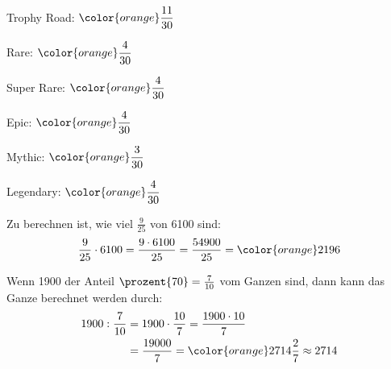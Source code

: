 \documentclass[12pt,a5paper,landscape]{scrartcl}
\def\clrLsg{\color{orange}}
\begin{document}
	\begin{loesungskarte}
		\begin{multicols}{2}
		\begin{enumeratea}
			\item \begin{smallitemize}
				\item Trophy Road: $\clrLsg\dfrac{11}{30}$
				\item Rare: $\clrLsg\dfrac{4}{30}$
				\item Super Rare: $\clrLsg\dfrac{4}{30}$
				\item Epic: $\clrLsg\dfrac{4}{30}$
				\item Mythic: $\clrLsg\dfrac{3}{30}$
				\item Legendary: $\clrLsg\dfrac{4}{30}$
			\end{smallitemize}
			
			\item Zu berechnen ist, wie viel $\tfrac{9}{25}$ von \num{6100} sind:
			\[ \frac{9}{25}\cdot 6100 = \frac{9\cdot 6100}{25} = \frac{54900}{25} = \clrLsg2196 \]
			
			\item Wenn \num{1900} der Anteil $\prozent{70} = \frac{7}{10}$ vom Ganzen sind, dann kann das Ganze berechnet werden durch:
			\begin{align*}
				1900: \frac{7}{10} &= 1900\cdot \frac{10}{7} = \frac{1900\cdot 10}{7} \\
				&= \frac{19000}{7} = \clrLsg 2714\frac{2}{7}\approx 2714
			\end{align*}
		\end{enumeratea}
		\end{multicols}
	\end{loesungskarte}
	
\end{document}
